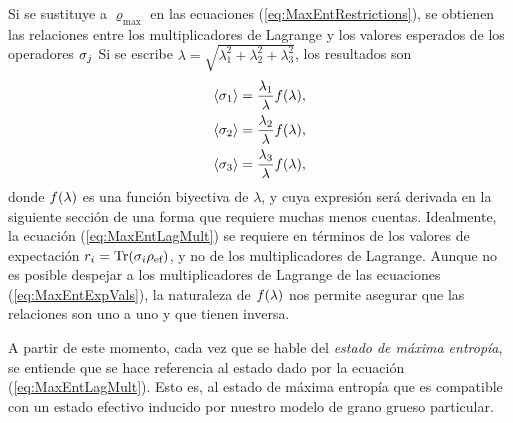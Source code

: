 Si se sustituye a $\varrho_{\max}$ en las ecuaciones (\ref{eq:MaxEntRestrictions}), se obtienen las relaciones entre los multiplicadores de Lagrange y los valores esperados de los operadores $\sigma_{j}$ Si se escribe $\lambda=\sqrt{\lambda_{1}^{2}+\lambda_{2}^{2}+\lambda_{3}^{2}}$, los resultados son
\begin{align}\label{eq:MaxEntExpVals}
    \begin{split}
    \expval{\sigma_{1}}&=\frac{\lambda_{1}}{\lambda}f(\lambda),\\
    \expval{\sigma_{2}}&=\frac{\lambda_{2}}{\lambda}f(\lambda),\\
    \expval{\sigma_{3}}&=\frac{\lambda_{3}}{\lambda}f(\lambda),
    \end{split}
\end{align}
donde $f(\lambda)$ es una función biyectiva de $\lambda$, y cuya expresión será derivada en la siguiente sección de una forma que requiere muchas menos cuentas. Idealmente, la ecuación (\ref{eq:MaxEntLagMult}) se requiere en términos de los valores de expectación $r_{i}=\Tr(\sigma_{i}\rho_{\text{ef}})$, y no de los multiplicadores de Lagrange. Aunque no es posible despejar a los multiplicadores de Lagrange de las ecuaciones (\ref{eq:MaxEntExpVals}), la naturaleza de $f(\lambda)$ nos permite asegurar que las relaciones son uno a uno y que tienen inversa.

A partir de este momento, cada vez que se hable del \textit{estado de máxima entropía}, se entiende que se hace referencia al estado dado por la ecuación (\ref{eq:MaxEntLagMult}). Esto es, al estado de máxima entropía que es compatible con un estado efectivo inducido por nuestro modelo de grano grueso particular.